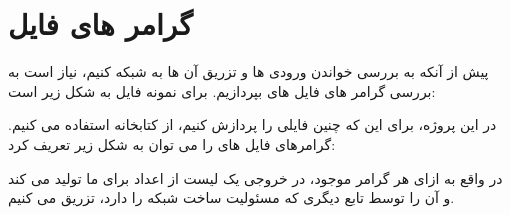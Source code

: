 \section{گرامر های فایل 
}

پیش از آنکه به بررسی خواندن ورودی ها و تزریق آن ها به شبکه کنیم، نیاز است به بررسی گرامر های فایل های 
بپردازیم. برای نمونه فایل 
به شکل زیر است:

\small{\lr{}}

در این پروژه، برای این که چنین فایلی را پردازش 
کنیم، از کتابخانه 
استفاده می کنیم. گرامرهای فایل های 
را می توان به شکل زیر تعریف کرد: 
\small {\lr{}}

در واقع به ازای هر گرامر موجود، در خروجی یک لیست از اعداد برای ما تولید می کند و آن را توسط تابع دیگری که مسئولیت ساخت شبکه را دارد، تزریق می کنیم.


